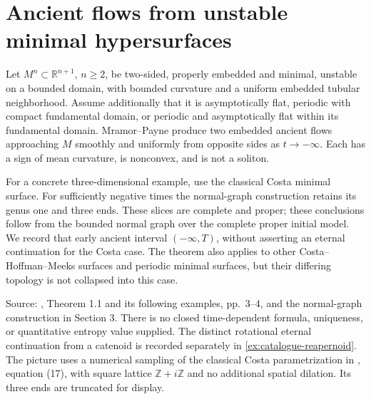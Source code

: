 \chapter{Ancient flows from unstable minimal hypersurfaces}\label{sec:catalogue-minimal-ancient-flows}
\begin{example}\label{ex:catalogue-minimal-ancient-flows}
Let $M^n\subset\mathbb R^{n+1}$, $n\geq2$, be two-sided, properly embedded and minimal, unstable on a bounded domain, with bounded curvature and a uniform embedded tubular neighborhood. Assume additionally that it is asymptotically flat, periodic with compact fundamental domain, or periodic and asymptotically flat within its fundamental domain. Mramor--Payne produce two embedded ancient flows approaching $M$ smoothly and uniformly from opposite sides as $t\to-\infty$. Each has a sign of mean curvature, is nonconvex, and is not a soliton.

For a concrete three-dimensional example, use the classical Costa minimal surface. For sufficiently negative times the normal-graph construction retains its genus one and three ends. These slices are complete and proper; these conclusions follow from the bounded normal graph over the complete proper initial model. We record that early ancient interval $(-\infty,T)$, without asserting an eternal continuation for the Costa case. The theorem also applies to other Costa--Hoffman--Meeks surfaces and periodic minimal surfaces, but their differing topology is not collapsed into this case.

Source: \cite{CatMP19}, Theorem 1.1 and its following examples, pp.~3--4, and the normal-graph construction in Section 3. There is no closed time-dependent formula, uniqueness, or quantitative entropy value supplied. The distinct rotational eternal continuation from a catenoid is recorded separately in \ref{ex:catalogue-reapernoid}. The picture uses a numerical sampling of the classical Costa parametrization in \cite{CatMelko2010}, equation (17), with square lattice $\mathbb Z+i\mathbb Z$ and no additional spatial dilation. Its three ends are truncated for display.


\end{example}

